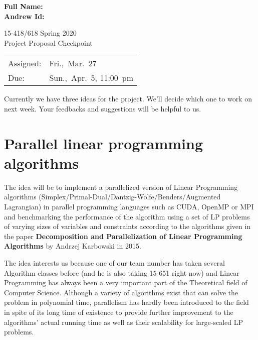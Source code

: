 \documentclass[11pt]{article}
\begin{document}
	\begin{flushright}
		{\large\bf Full Name: } \\[1ex]
		
		{\large\bf Andrew Id: } \\[1ex]
	\end{flushright}
	\vspace*{0.3in}
	\begin{center}
		\LARGE
		15-418/618 Spring 2020{} \\
		Project Proposal Checkpoint
		\\ 
	\end{center}
	
	\begin{center}
		\Large        
		\begin{tabular}{ll}
			\hline             
			Assigned: & Fri.,~Mar.~27  \\
			Due: &  Sun.,~Apr.~5, 11:00~pm  \\
			\hline       
		\end{tabular}
	\end{center} 

	Currently we have three ideas for the project. We'll decide which one to work on next week. Your feedbacks and suggestions will be helpful to us.
	
	\section{Parallel linear programming algorithms}
	The idea will be to implement a parallelized version of Linear Programming algorithms (Simplex/Primal-Dual/Dantzig-Wolfe/Benders/Augmented Lagrangian) in parallel programming languages such as CUDA, OpenMP or MPI and benchmarking the performance of the algorithm using a set of LP problems of varying sizes of variables and constraints according to the algorithms given in the paper \textbf{Decomposition and Parallelization of Linear Programming Algorithms} by Andrzej Karbowski in 2015.
	
	The idea interests us because one of our team number has taken several Algorithm classes before (and he is also taking 15-651 right now) and Linear Programming has always been a very important part of the Theoretical field of Computer Science. Although a variety of algorithms exist that can solve the problem in polynomial time, parallelism has hardly been introduced to the field in spite of its long time of existence to provide further improvement to the algorithms' actual running time as well as their scalability for large-scaled LP problems.
	
\end{document}

